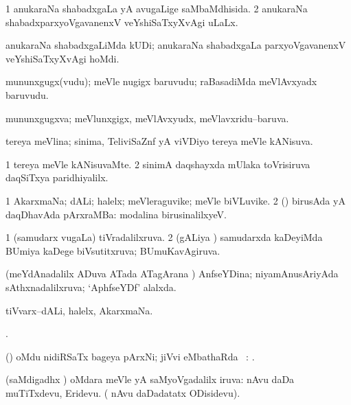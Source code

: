 \bentry
{}
\gl{\gu}
\bmng
\bnum
\num{1} anukaraNa shabadxgaLa yA avugaLige saMbaMdhisida. 
\num{2} anukaraNa shabadxparxyoVgavanenxV veYshiSaTxyXvAgi uLaLx. 
\enum
\emng
\eentry

\bentry
{}
\gl{\kirxvi}
\bmng
anukaraNa shabadxgaLiMda kUDi; anukaraNa shabadxgaLa parxyoVgavanenxV veYshiSaTxyXvAgi hoMdi. 
\emng
\eentry

\bentry
{}
\gl{\nA}
\bmng
mununxgugx(vudu); meVle nugigx baruvudu; raBasadiMda meVlAvxyadx baruvudu. 
\emng
\eentry

\bentry
{}
\gl{\gu}
\bmng
mununxgugxva; meVlunxgigx, meVlAvxyudx, meVlavxridu--baruva. 
\emng
\eentry

\bentry
{}
\gl{\gu}
\bmng
tereya meVlina; sinima, TeliviSaZnf yA viVDiyo tereya meVle kANisuva. 
\emng
\eentry

\bentry
{}
\gl{\kirxvi}
\bmng
\bnum
\num{1} tereya meVle kANisuvaMte. 
\num{2} sinimA daqshayxda mUlaka toVrisiruva daqSiTxya paridhiyalilx. 
\enum
\emng
\eentry

\bentry
{}
\gl{\nA}
\bmng
\bnum
\num{1} AkarxmaNa; dALi; halelx; meVleraguvike; meVle biVLuvike. 
\num{2} (\kanmu) birusAda yA daqDhavAda pArxraMBa:  modalina birusinalilxyeV. 
\enum
\emng
\eentry

\bentry
{}
\gl{\gu}
\bmng
\bnum
\num{1} (samudarx \mo vugaLa) tiVradalilxruva. 
\num{2} (gALiya \vi) samudarxda kaDeyiMda BUmiya kaDege biVsutitxruva; BUmuKavAgiruva. 
\enum
\emng
\eentry

\bentry
{}
\gl{\gu}
\bmng
(meYdAnadalilx ADuva ATada ATagArana \vi) AnfseYDina; niyamAnusAriyAda sAthxnadalilxruva; `AphfseYDf' alalxda. 
\emng
\eentry

\bentry
{}
\gl{\nA}
\bmng
tiVvarx--dALi, halelx, AkarxmaNa. 
\emng
\eentry

\bentry
{}
\gl{\saMkiSx}
\bmng
{}. 
\emng
\eentry

\bentry
{}
\gl{\sapUpa}
\bmng
(\jiVvi) oMdu nidiRSaTx bageya pArxNi; jiVvi eMbathaRda \sapUpa\ : . 
\emng
\eentry

\bentry
{}
\gl{\upa}
\bmng
(saMdigadhx \parx) oMdara meVle yA saMyoVgadalilx iruva:  nAvu daDa muTiTxdevu, Eridevu. ( nAvu daDadatatx ODisidevu). 
\emng
\eentry

